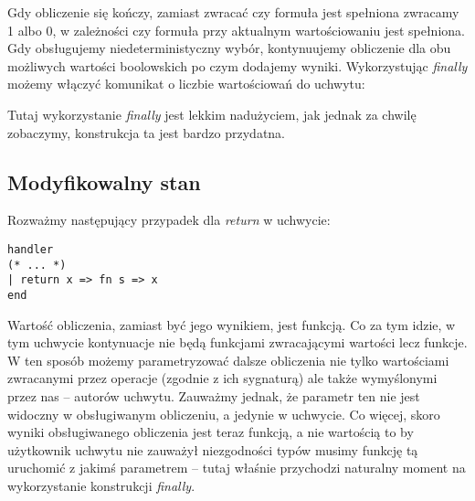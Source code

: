 Gdy obliczenie się kończy, zamiast zwracać czy formuła jest spełniona zwracamy 1 albo 0, w zależności czy formuła przy aktualnym wartościowaniu jest spełniona. Gdy obsługujemy niedeterministyczny wybór, kontynuujemy obliczenie dla obu możliwych wartości boolowskich po czym dodajemy wyniki. Wykorzystując \textit{finally} możemy włączyć komunikat o liczbie wartościowań do uchwytu:





Tutaj wykorzystanie \textit{finally} jest lekkim nadużyciem, jak jednak za chwilę zobaczymy, konstrukcja ta jest bardzo przydatna.

\subsection{Modyfikowalny stan}

Rozważmy następujący przypadek dla \textit{return} w uchwycie:

\begin{minipage}{\linewidth}\begin{lstlisting}
handler
(* ... *)
| return x => fn s => x
end
\end{lstlisting}\end{minipage}

Wartość obliczenia, zamiast być jego wynikiem, jest funkcją. Co za tym idzie, w tym uchwycie kontynuacje nie będą funkcjami zwracającymi wartości lecz funkcje. W ten sposób możemy parametryzować dalsze obliczenia nie tylko wartościami zwracanymi przez operacje (zgodnie z ich sygnaturą) ale także wymyślonymi przez nas -- autorów uchwytu. Zauważmy jednak, że parametr ten nie jest widoczny w obsługiwanym obliczeniu, a jedynie w uchwycie. Co więcej, skoro wyniki obsługiwanego obliczenia jest teraz funkcją, a nie wartością to by użytkownik uchwytu nie zauważył niezgodności typów musimy funkcję tą uruchomić z jakimś parametrem -- tutaj właśnie przychodzi naturalny moment na wykorzystanie konstrukcji \textit{finally}.

